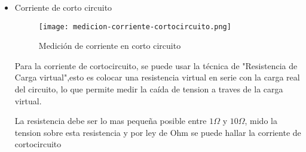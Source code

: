 \begin{itemize}
    \item Corriente de corto circuito
    \begin{figure}[ht]
        \centering
        \texttt{[image: medicion-corriente-cortocircuito.png]}
        \caption{Medición de corriente en corto circuito}
        \label{fig:medicion-corriente-cortocircuito}
    \end{figure}
    Para la corriente de cortocircuito, se puede usar la técnica de "Resistencia de Carga virtual",esto es colocar una resistencia virtual en serie con la carga real del circuito, lo que permite medir la caída de tension a traves de la carga virtual.

    La resistencia debe ser lo mas pequeña posible entre $1\Omega$ y $10\Omega$, mido la tension sobre esta resistencia y por ley de Ohm se puede hallar la corriente de cortocircuito


\end{itemize}